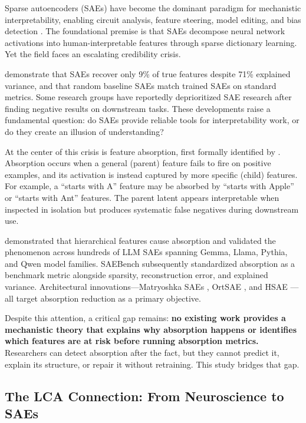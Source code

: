 \documentclass{article}
\begin{document}
Sparse autoencoders (SAEs) have become the dominant paradigm for mechanistic interpretability, enabling circuit analysis, feature steering, model editing, and bias detection \citep{bricken2023, marks2024sparse, templeton2024scaling}. The foundational premise is that SAEs decompose neural network activations into human-interpretable features through sparse dictionary learning. Yet the field faces an escalating credibility crisis.

\citet{korznikov2025ort} demonstrate that SAEs recover only 9\% of true features despite 71\% explained variance, and that random baseline SAEs match trained SAEs on standard metrics. Some research groups have reportedly deprioritized SAE research after finding negative results on downstream tasks. These developments raise a fundamental question: do SAEs provide reliable tools for interpretability work, or do they create an illusion of understanding?

At the center of this crisis is feature absorption, first formally identified by \citet{chanin2024quantifying}. Absorption occurs when a general (parent) feature fails to fire on positive examples, and its activation is instead captured by more specific (child) features. For example, a ``starts with A'' feature may be absorbed by ``starts with Apple'' or ``starts with Ant'' features. The parent latent appears interpretable when inspected in isolation but produces systematic false negatives during downstream use.

\citet{chanin2024quantifying} demonstrated that hierarchical features cause absorption and validated the phenomenon across hundreds of LLM SAEs spanning Gemma, Llama, Pythia, and Qwen model families. SAEBench \citep{karvonen2025saebench} subsequently standardized absorption as a benchmark metric alongside sparsity, reconstruction error, and explained variance. Architectural innovations---Matryoshka SAEs \citep{bussmann2025matryoshka}, OrtSAE \citep{korznikov2025ort}, and HSAE \citep{luo2026hsae}---all target absorption reduction as a primary objective.

Despite this attention, a critical gap remains: \textbf{no existing work provides a mechanistic theory that explains why absorption happens or identifies which features are at risk before running absorption metrics.} Researchers can detect absorption after the fact, but they cannot predict it, explain its structure, or repair it without retraining. This study bridges that gap.

\subsection{The LCA Connection: From Neuroscience to SAEs}
\end{document}
